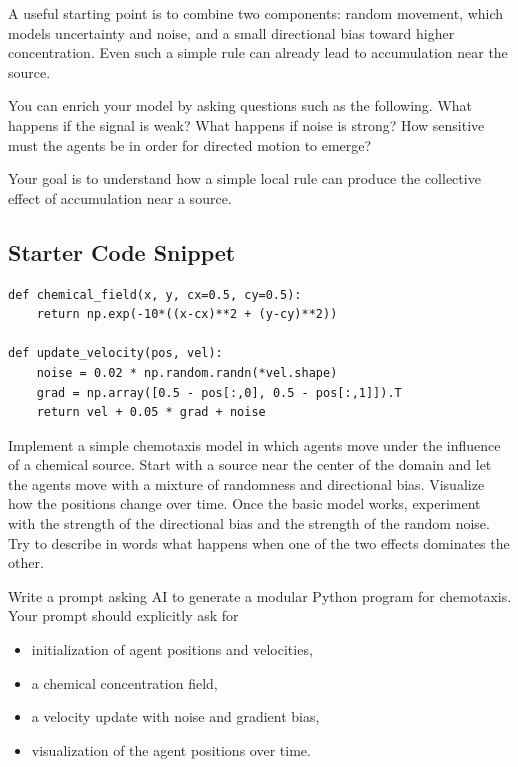 \documentclass[paper=letter, fontsize=12pt]{article}
\numberwithin{equation}{section}
\begin{document}
A useful starting point is to combine two components: random movement, which models uncertainty and noise, and a small directional bias toward higher concentration. Even such a simple rule can already lead to accumulation near the source.

You can enrich your model by asking questions such as the following. What happens if the signal is weak? What happens if noise is strong? How sensitive must the agents be in order for directed motion to emerge?

Your goal is to understand how a simple local rule can produce the collective effect of accumulation near a source.

\subsection*{Starter Code Snippet}

\begin{lstlisting}
def chemical_field(x, y, cx=0.5, cy=0.5):
    return np.exp(-10*((x-cx)**2 + (y-cy)**2))

def update_velocity(pos, vel):
    noise = 0.02 * np.random.randn(*vel.shape)
    grad = np.array([0.5 - pos[:,0], 0.5 - pos[:,1]]).T
    return vel + 0.05 * grad + noise
\end{lstlisting}

\begin{taskbox}
Implement a simple chemotaxis model in which agents move under the influence of a chemical source. Start with a source near the center of the domain and let the agents move with a mixture of randomness and directional bias. Visualize how the positions change over time. Once the basic model works, experiment with the strength of the directional bias and the strength of the random noise. Try to describe in words what happens when one of the two effects dominates the other.
\end{taskbox}

\begin{aibox}
Write a prompt asking AI to generate a modular Python program for chemotaxis. Your prompt should explicitly ask for
\begin{itemize}
\item initialization of agent positions and velocities,
\item a chemical concentration field,
\item a velocity update with noise and gradient bias,
\item visualization of the agent positions over time.
\end{itemize}
\end{aibox}
\end{document}
